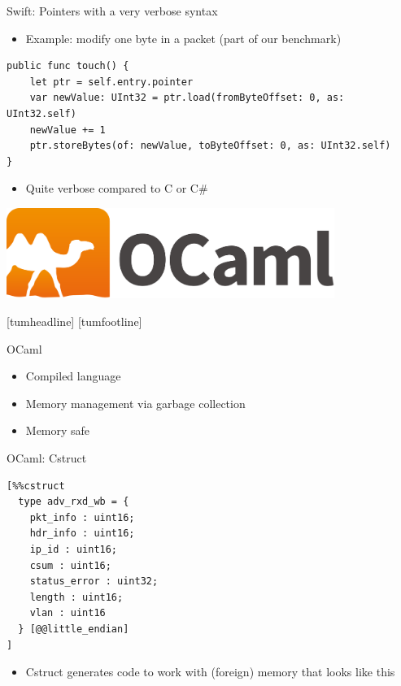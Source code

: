 \documentclass[NET,english,aspectratio=169,notitleframe]{tumbeamer}
\begin{document}
\begin{frame}[fragile]{Swift: Pointers with a very verbose syntax}
\begin{itemize}
\item Example: modify one byte in a packet (part of our benchmark)
\end{itemize}
\begin{verbatim}
public func touch() {
    let ptr = self.entry.pointer
    var newValue: UInt32 = ptr.load(fromByteOffset: 0, as: UInt32.self)
    newValue += 1
    ptr.storeBytes(of: newValue, toByteOffset: 0, as: UInt32.self)
}
\end{verbatim}
\begin{itemize}
\item Quite verbose compared to C or C\#
\end{itemize}
\end{frame}



\begin{frame}{}
\centering\includegraphics[width=0.8\textwidth]{pics/ocaml}
\end{frame}
[tumheadline]
[tumfootline]

\begin{frame}{OCaml}
\begin{itemize}
\item Compiled language
\item Memory management via garbage collection
\item Memory safe
\end{itemize}
\end{frame}


\begin{frame}[fragile]{OCaml: Cstruct}
\begin{verbatim}
[%%cstruct
  type adv_rxd_wb = {
    pkt_info : uint16;
    hdr_info : uint16;
    ip_id : uint16;
    csum : uint16;
    status_error : uint32;
    length : uint16;
    vlan : uint16
  } [@@little_endian]
]
\end{verbatim}
\begin{itemize}
\item Cstruct generates code to work with (foreign) memory that looks like this
\end{itemize}
\end{frame}
\end{document}
